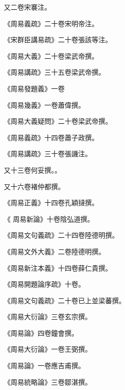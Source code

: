 \begin{pinyinscope}
 又二卷宋褰注。



 《周易義疏》二十卷宋明帝注。



 《宋群臣講易疏》二十卷張該等注。



 《周易大義》二十卷梁武帝撰。



 《周易講疏》三十五卷梁武帝撰。



 《周易發題義》一卷



 《周易幾義》一卷蕭偉撰。



 《周易大義疑問》二十卷梁武帝撰。



 《周易義疏》十四卷蕭子政撰。



 《周易講疏》三十卷張譏注。



 又十三卷何妥撰。。



 又十六卷褚仲都撰。



 《周易正義》十四卷孔穎撻撰。



 《
 周易新論》十卷陰弘道撰。



 《周易文句義疏》二十四卷陸德明撰。



 《周易文外大義》二卷陸德明撰。



 《周易新注本義》十四卷薛仁貴撰。



 《周易開題論序疏》十卷。



 《周易文句義疏》二十卷已上並梁蕃撰。



 《周易大衍論》三卷玄宗撰。



 《周易論》四卷鐘會撰。



 《周易大衍論》一卷王弼撰。



 《周易論》一卷應吉甫撰。



 《周易統略論》三卷鄒湛撰。




\end{pinyinscope}
